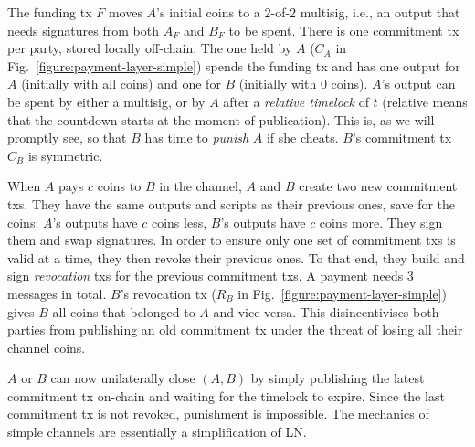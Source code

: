   The funding tx $F$ moves $A$'s initial coins to a $2$-of-$2$ multisig, i.e., an
  output that needs signatures from both $A_F$ and $B_F$ to be spent. There is one
  commitment tx per party, stored locally off-chain. The one held by $A$
  ($C_A$ in Fig.~\ref{figure:payment-layer-simple}) spends the funding tx
  and has one output for $A$ (initially with all coins) and one for $B$
  (initially with $0$ coins). $A$'s output can be spent by either a multisig, or
  by $A$ after a \emph{relative timelock} of $t$ (relative means that the countdown starts at the moment of
  publication). This is, as we will promptly see, so
  that $B$ has time to \emph{punish} $A$ if she cheats. $B$'s commitment tx
  $C_B$ is symmetric.

  When $A$ pays $c$ coins to $B$ in the channel, $A$ and $B$ create two new
  commitment txs.
  They have the same outputs and scripts as their previous ones, save for the
  coins: $A$'s outputs have $c$ coins less, $B$'s outputs have $c$ coins more.
  They sign them and swap signatures. In order to ensure only one set of
  commitment txs is valid at a time, they then revoke their previous ones. To
  that end, they build and sign \emph{revocation} txs for the previous
  commitment txs. A payment needs $3$ messages in total. $B$'s revocation tx ($R_B$ in
  Fig.~\ref{figure:payment-layer-simple}) gives $B$ all coins that belonged
  to $A$ and vice versa. This disincentivises both parties
  from publishing an old commitment tx under the threat of
  losing all their channel coins.

  $A$ or $B$ can now unilaterally close $(A, B)$ by simply publishing the latest
  commitment tx on-chain and waiting for the timelock to expire. Since the last
  commitment tx is not revoked, punishment is impossible. The
  mechanics of simple channels are essentially a simplification of LN.

